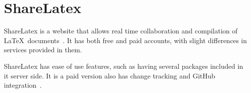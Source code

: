 \section{ShareLatex}

ShareLatex is a website that allows real time collaboration and compilation
of \LaTeX~documents~\cite{www-hid-sp18-601-slatex-documentation}. It has both 
free and paid accounts, with slight differences in services provided in them.
 
ShareLatex has ease of use features, such as having several packages included 
in it server side. It is a paid version also has change tracking and GitHub
integration~\cite{www-hid-sp18-601-slatex-plans}.
